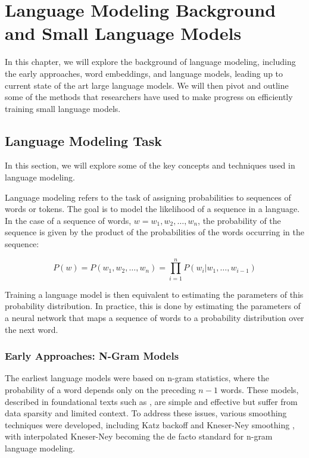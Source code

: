 \chapter{Language Modeling Background and Small Language Models}

In this chapter, we will explore the background of language modeling, including the early approaches, word embeddings, and language models, leading up to current state of the art large language models. We will then pivot and outline some of the methods that researchers have used to make progress on efficiently training small language models. 

\section{Language Modeling Task}

In this section, we will explore some of the key concepts and techniques used in language modeling. 

Language modeling refers to the task of assigning probabilities to sequences of words or tokens. The goal is to model the likelihood of a sequence in a language. In the case of a sequence of words, $w = w_1, w_2, \ldots, w_n$, the probability of the sequence is given by the product of the probabilities of the words occurring in the sequence:

\begin{equation}    
    P(w) = P(w_1, w_2, \ldots, w_n) = \prod_{i=1}^n P(w_i | w_1, \ldots, w_{i-1})
\end{equation}

Training a language model is then equivalent to estimating the parameters of this probability distribution. In practice, this is done by estimating the parameters of a neural network that maps a sequence of words to a probability distribution over the next word. 

\subsection{Early Approaches: N-Gram Models}
The earliest language models were based on n-gram statistics, where the probability of a word depends only on the preceding $n-1$ words. These models, described in foundational texts such as \cite{jurafsky2025speech}, are simple and effective but suffer from data sparsity and limited context. To address these issues, various smoothing techniques were developed, including Katz backoff \citep{katz2003estimation} and Kneser-Ney smoothing \citep{kneser1995improved}, with interpolated Kneser-Ney \citep{chen1999empirical} becoming the de facto standard for n-gram language modeling.

